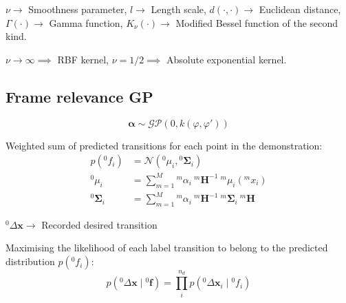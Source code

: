 \( \nu \to \) Smoothness parameter, \( l \to \) Length scale, \( d(\cdot, \cdot) \to \) Euclidean distance, \( \Gamma(\cdot) \to \) Gamma function, \( K_\nu(\cdot) \to \) Modified Bessel function of the second kind.

\( \nu \to \infty \implies \) RBF kernel, \( \nu = 1/2 \implies \) Absolute exponential kernel.

\subsection{Frame relevance GP}

\begin{equation}
    \boldsymbol{\alpha} \sim \mathcal{GP}(0, k(\varphi, \varphi'))
\end{equation}

Weighted sum of predicted transitions for each point in the demonstration:
\begin{align}
    p \left( {}^{0}f_i \right)
     & =
    \mathcal{N} \left( {}^{0}\mu_i, {}^{0}\boldsymbol{\Sigma}_i \right)
    \\
    {}^{0}\mu_i
     & =
    \sum_{m = 1}^M {}^{m}\alpha_i \ {}^{m}\boldsymbol{H}^{-1} \ {}^{m}\mu_i \left( {}^{m}x_i \right)
    \\
    {}^{0}\boldsymbol{\Sigma}_i
     & =
    \sum_{m = 1}^M {}^{m}\alpha_i \ {}^{m}\boldsymbol{H}^{-1} \ {}^{m}\boldsymbol{\Sigma}_i \ {}^{m}\boldsymbol{H}
\end{align}

\( {}^{0}\Delta\boldsymbol{x} \to \) Recorded desired transition

Maximising the likelihood of each label transition to belong to the predicted distribution \( p \left( {}^{0}f_i \right) \):
\begin{equation}
    p \left( {}^{0}\Delta\boldsymbol{x} \mid {}^{0}\boldsymbol{f} \right)
    =
    \prod_{i}^{n_d} p \left( {}^{0}\Delta\boldsymbol{x}_i \mid {}^{0}f_i \right)
\end{equation}
